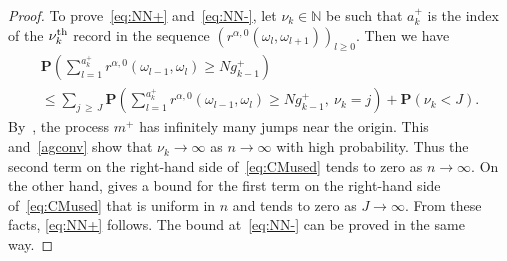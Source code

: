 \documentclass[AHL,Unicode,longabstracts,published]{cedram}
\newcommand{\N}{\mathbb N}
\newcommand{\bfP}{\mathbf{P}}
\begin{document}
\begin{proof}
To prove~\eqref{eq:NN+} and~\eqref{eq:NN-}, let $\nu_k\in \N$ be such that $a^+_k$ is the index of the $\nu_k^{\rm th}$ record in the sequence $(r^{\alpha,0}(\omega_l,\omega_{l+1}))_{l\ge 0}$. Then we have
\begin{multline}\label{eq:CMused}
\bfP\left({\textstyle \sum_{l=1}^{a_k^+}}r^{\alpha,0}\left(\omega_{l-1},\omega_{l}\right) \geq N g_{k-1}^+\right) \\
\le \sum_{j\,\ge\,J}\bfP\left({\textstyle \sum_{l=1}^{a_k^+}}r^{\alpha,0}\left(\omega_{l-1},\omega_{l}\right) \geq N g_{k-1}^+, \:\nu_k=j\right) + \bfP(\nu_k< J).
\end{multline}
By~\cite[Proposition~4.9]{Res87}, the process $m^+$ has infinitely many jumps near the origin. This and~\eqref{agconv} show that $\nu_k \to \infty$ as $n\to\infty$ with high probability. Thus the second term on the right-hand side of~\eqref{eq:CMused} tends to zero as $n\to\infty$. On the other hand, \cite[Lemma~3.8]{CM2} gives a bound for the first term on the right-hand side of~\eqref{eq:CMused} that is uniform in $n$ and tends to zero as $J\to\infty$. From these facts, \eqref{eq:NN+} follows. The bound at~\eqref{eq:NN-} can be proved in the same way.


\end{proof}
\end{document}

